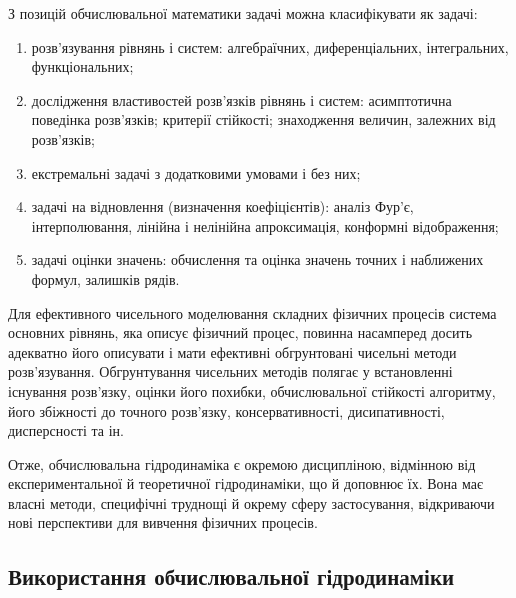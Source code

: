 З позицій обчислювальної математики задачі можна класифікувати як задачі: 
\begin{enumerate}
    \item розв'язування рівнянь і систем: алгебраїчних, диференціальних, інтегральних, функціональних; 
    \item дослідження властивостей розв'язків рівнянь і систем: асимптотична поведінка розв'язків; критерії стійкості; знаходження величин, залежних від розв'язків; 
    \item екстремальні задачі з додатковими умовами і без них; 
    \item задачі на відновлення (визначення коефіцієнтів): аналіз Фур'є, інтерполювання, лінійна і нелінійна апроксимація, конформні відображення;
    \item задачі оцінки значень: обчислення та оцінка значень точних і наближених формул, залишків рядів.
\end{enumerate}

Для ефективного чисельного моделювання складних фізичних процесів система основних рівнянь, яка описує фізичний процес, повинна насамперед досить адекватно його описувати і мати ефективні обгрунтовані чисельні методи розв'язування. Обгрунтування чисельних методів полягає у встановленні існування розв'язку, оцінки його похибки, обчислювальної стійкості алгоритму, його збіжності до точного розв'язку, консервативності, дисипативності, дисперсності та ін. \medskip

Отже, обчислювальна гідродинаміка є окремою дисципліною, відмінною від експериментальної й теоретичної гідродинаміки, що й доповнює їх. Вона має власні методи, специфічні труднощі й окрему сферу застосування, відкриваючи нові перспективи для вивчення фізичних процесів.

\subsection{Використання обчислювальної гідродинаміки}

